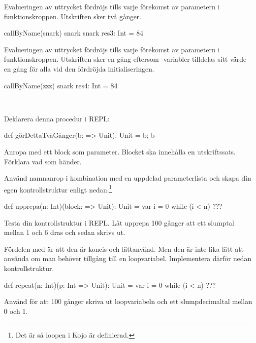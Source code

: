 \SubtaskSolved Evalueringen av uttrycket  fördröjs tills varje förekomst av parametern  i funktionskroppen. Utskriften sker två gånger.
\begin{REPL}
callByName(snark)
snark snark res3: Int = 84
\end{REPL}

\SubtaskSolved Evalueringen av uttrycket  fördröjs tills varje förekomst av parametern  i funktionskroppen. Utskriften sker en gång eftersom -variabler tilldelas sitt värde en gång för alla vid den fördröjda initialiseringen.
\begin{REPL}
callByName(zzz)
snark res4: Int = 84
\end{REPL}

\QUESTEND





\QUESTBEGIN

\Task  \what~

\Subtask Deklarera denna procedur i REPL:
\begin{Code}
def görDettaTvåGånger(b: => Unit): Unit = { b; b }
\end{Code}

\Subtask Anropa  med ett block som parameter. Blocket ska innehålla en utskriftssats. Förklara vad som händer.

\Subtask Använd namnanrop i kombination med en uppdelad parameterlista och skapa din egen kontrollstruktur enligt nedan.\footnote{Det är så loopen  i Kojo är definierad.}
\begin{Code}
def upprepa(n: Int)(block: => Unit): Unit = {
   var i = 0
   while (i < n) { ??? }
}
\end{Code}

\Subtask
Testa din kontrollstruktur i REPL. Låt upprepa 100 gånger att ett slumptal mellan 1 och 6 dras och sedan skrivs ut.

\Subtask Fördelen med  är att den är koncis och lättanvänd. Men den är inte lika lätt att använda om man behöver tillgång till en loopvariabel. Implementera därför nedan kontrollstruktur.

\begin{Code}
def repeat(n: Int)(p: Int => Unit): Unit = {
   var i = 0
   while (i < n) { ??? }
}
\end{Code}

\Subtask Använd  för att 100 gånger skriva ut loopvariabeln och ett slumpdecimaltal mellan 0 och 1.


